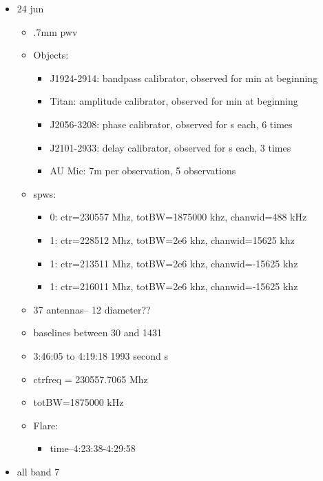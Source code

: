 \documentclass[a4paper]{tufte-handout}
\begin{document}
\begin{itemize}
	\item 24 jun
	      \begin{itemize}
	      	\item \abt .7mm pwv
	      	\item Objects:
	      	      \begin{itemize}
	      	      	\item J1924-2914: bandpass calibrator, observed for  min at beginning
	      	      	\item Titan: amplitude calibrator, observed for  min at beginning
	      	      	\item J2056-3208: phase calibrator, observed for  s each, 6 times
	      	      	\item J2101-2933: delay calibrator, observed for  s each, 3 times
	      	      	\item AU Mic: \abt 7m per observation, 5 observations
	      	      \end{itemize}
	      	\item spws:
	      	      \begin{itemize}
	      	      	\item 0: ctr=230557 Mhz, totBW=1875000 khz, chanwid=488 kHz
	      	      	\item 1: ctr=228512 Mhz, totBW=2e6 khz, chanwid=15625 khz
	      	      	\item 1: ctr=213511 Mhz, totBW=2e6 khz, chanwid=-15625 khz
	      	      	\item 1: ctr=216011 Mhz, totBW=2e6 khz, chanwid=-15625 khz
	      	      \end{itemize}
	      	\item 37 antennas-- 12 diameter??
	      	\item baselines between 30 and 1431
	      	\item 3:46:05 to 4:19:18 1993 second  s
	      	\item ctrfreq = 230557.7065 Mhz
	      	\item totBW=1875000 kHz
          \item Flare:
            \begin{itemize}
              \item time--4:23:38-4:29:58
            \end{itemize}
	      \end{itemize}

	\item all band 7

\end{itemize}
\end{document}
